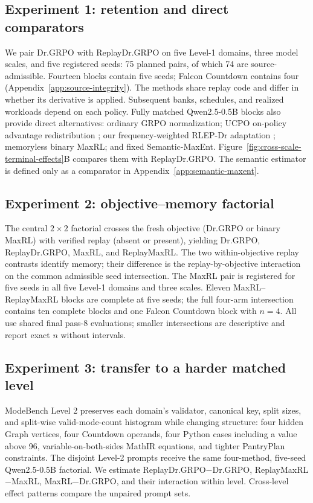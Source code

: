 \subsection{Experiment 1: retention and direct comparators}
\label{sec:retention-design}

We pair Dr.GRPO with ReplayDr.GRPO on five Level-1
domains, three model scales, and five registered seeds: 75 planned pairs, of
which 74 are source-admissible. Fourteen blocks contain five seeds; Falcon
Countdown contains four (Appendix~\ref{app:source-integrity}). The methods
share replay code and differ in whether its derivative is applied. Subsequent
banks, schedules, and realized workloads depend on each policy. Fully matched
Qwen2.5-0.5B blocks also provide direct alternatives: ordinary GRPO
normalization; UCPO on-policy advantage redistribution
\citep{lochab2026ucpo}; our frequency-weighted RLEP-Dr adaptation
\citep{zhang2025rlep}; memoryless binary MaxRL; and fixed Semantic-MaxEnt.
Figure~\ref{fig:cross-scale-terminal-effects}B compares them with
ReplayDr.GRPO. The semantic estimator is defined only as a comparator in
Appendix~\ref{app:semantic-maxent}.

\subsection{Experiment 2: objective--memory factorial}
\label{sec:factorial-design}

The central \(2\times2\) factorial crosses the fresh
objective (Dr.GRPO or binary MaxRL) with verified replay (absent or present),
yielding Dr.GRPO, ReplayDr.GRPO, MaxRL, and ReplayMaxRL. The two
within-objective replay contrasts identify memory; their difference is the
replay-by-objective interaction on the common admissible seed intersection.
The MaxRL pair is registered for five seeds in all five Level-1 domains and
three scales. Eleven MaxRL--ReplayMaxRL blocks are complete at five seeds; the
full four-arm intersection contains ten complete blocks and one Falcon
Countdown block with \(n=4\). All use shared final pass-8 evaluations; smaller
intersections are descriptive and report exact \(n\) without intervals.

\subsection{Experiment 3: transfer to a harder matched level}
\label{sec:levels-design}

ModeBench Level 2 preserves each domain's validator,
canonical key, split sizes, and split-wise valid-mode-count histogram while
changing structure: four hidden Graph vertices, four Countdown operands, four
Python cases including a value above 96, variable-on-both-sides MathIR
equations, and tighter PantryPlan constraints. The disjoint Level-2 prompts receive the same four-method,
five-seed Qwen2.5-0.5B factorial. We estimate
ReplayDr.GRPO\(-\)Dr.GRPO, ReplayMaxRL\(-\)MaxRL,
MaxRL\(-\)Dr.GRPO, and their interaction within level. Cross-level effect
patterns compare the unpaired prompt sets.




